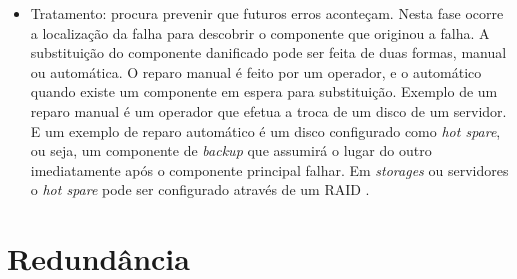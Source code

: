 \begin{itemize}
\begin{itemize}
 \end{itemize}
 \item Tratamento: procura prevenir que futuros erros aconteçam. Nesta fase ocorre a localização da falha para descobrir o 
 componente que originou a falha. A substituição do componente danificado pode ser feita de duas formas, manual ou automática. 
 O reparo manual é feito por um operador, e o automático quando existe um componente em espera para substituição. Exemplo de um reparo 
 manual é um operador que efetua a troca de um disco de um servidor. E um exemplo de reparo automático é um disco configurado como 
 \textit{hot spare}, ou seja, um componente de \textit{backup} que assumirá o lugar do outro imediatamente após o componente principal 
 falhar. Em \textit{storages} ou servidores o \textit{hot spare} pode ser configurado através de um \ac{RAID} \cite{rouse2013}.
\end{itemize}

\section{Redundância}
\label{section:redundancia}

